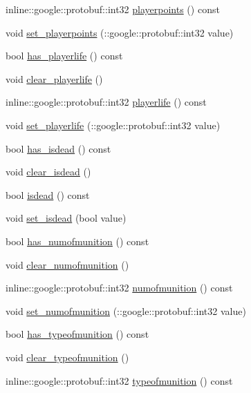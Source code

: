 \begin{DoxyCompactItemize}
inline\-::google\-::protobuf\-::int32 \hyperlink{class_player_status_a573842d49971874f154de31bcf52efb9}{playerpoints} () const 
\item 
void \hyperlink{class_player_status_a368618e48276a5d8bc2744578b0316cf}{set\-\_\-playerpoints} (\-::google\-::protobuf\-::int32 value)
\item 
bool \hyperlink{class_player_status_ad64bd569ef1e245fd8a014fcd8f04090}{has\-\_\-playerlife} () const 
\item 
void \hyperlink{class_player_status_a11691b2df689ecf3e2326e1b79c7abad}{clear\-\_\-playerlife} ()
\item 
inline\-::google\-::protobuf\-::int32 \hyperlink{class_player_status_afa7a932b0873514837c8510653e5af8e}{playerlife} () const 
\item 
void \hyperlink{class_player_status_a0df038d9ba5b74adf38613ebc31145bb}{set\-\_\-playerlife} (\-::google\-::protobuf\-::int32 value)
\item 
bool \hyperlink{class_player_status_ad9ced9478424750043236d941be787ac}{has\-\_\-isdead} () const 
\item 
void \hyperlink{class_player_status_a10a63552e37c6ed389f628b4f0b23e09}{clear\-\_\-isdead} ()
\item 
bool \hyperlink{class_player_status_ab2bab29066cc2dfe5a955ca97b8399df}{isdead} () const 
\item 
void \hyperlink{class_player_status_a5455c655f5e9ef116b8a9c0d01ae6bf9}{set\-\_\-isdead} (bool value)
\item 
bool \hyperlink{class_player_status_aedd0ba4ab7fc76b8a65e0fd5a23c2050}{has\-\_\-numofmunition} () const 
\item 
void \hyperlink{class_player_status_a6ba4592adf5601fb83dd30f4795782ae}{clear\-\_\-numofmunition} ()
\item 
inline\-::google\-::protobuf\-::int32 \hyperlink{class_player_status_ab687554cb754eb588560c88fe4463c9c}{numofmunition} () const 
\item 
void \hyperlink{class_player_status_a4c2212ad0929db7347b7cd7b4dcb9f81}{set\-\_\-numofmunition} (\-::google\-::protobuf\-::int32 value)
\item 
bool \hyperlink{class_player_status_a4bab5a0a30765503c645b4350bb7fde8}{has\-\_\-typeofmunition} () const 
\item 
void \hyperlink{class_player_status_ad37747c7d34b4104483fae73f48891a5}{clear\-\_\-typeofmunition} ()
\item 
inline\-::google\-::protobuf\-::int32 \hyperlink{class_player_status_a7438b0ef8fc2f48f1a015dc0366c187b}{typeofmunition} () const 

\end{DoxyCompactItemize}
